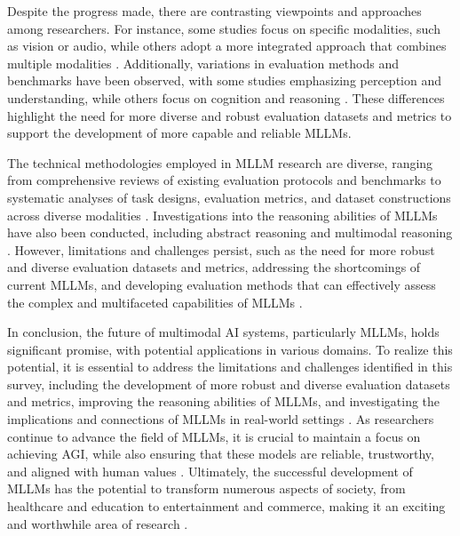 \documentclass[conference]{IEEEtran}
\begin{document}
Despite the progress made, there are contrasting viewpoints and approaches among researchers. For instance, some studies focus on specific modalities, such as vision or audio, while others adopt a more integrated approach that combines multiple modalities \cite{b8}. Additionally, variations in evaluation methods and benchmarks have been observed, with some studies emphasizing perception and understanding, while others focus on cognition and reasoning \cite{b9}. These differences highlight the need for more diverse and robust evaluation datasets and metrics to support the development of more capable and reliable MLLMs.

The technical methodologies employed in MLLM research are diverse, ranging from comprehensive reviews of existing evaluation protocols and benchmarks to systematic analyses of task designs, evaluation metrics, and dataset constructions across diverse modalities \cite{b10}. Investigations into the reasoning abilities of MLLMs have also been conducted, including abstract reasoning and multimodal reasoning \cite{b11}. However, limitations and challenges persist, such as the need for more robust and diverse evaluation datasets and metrics, addressing the shortcomings of current MLLMs, and developing evaluation methods that can effectively assess the complex and multifaceted capabilities of MLLMs \cite{b12}.

In conclusion, the future of multimodal AI systems, particularly MLLMs, holds significant promise, with potential applications in various domains. To realize this potential, it is essential to address the limitations and challenges identified in this survey, including the development of more robust and diverse evaluation datasets and metrics, improving the reasoning abilities of MLLMs, and investigating the implications and connections of MLLMs in real-world settings \cite{b13}. As researchers continue to advance the field of MLLMs, it is crucial to maintain a focus on achieving AGI, while also ensuring that these models are reliable, trustworthy, and aligned with human values \cite{b14}. Ultimately, the successful development of MLLMs has the potential to transform numerous aspects of society, from healthcare and education to entertainment and commerce, making it an exciting and worthwhile area of research \cite{b15}.
\end{document}

